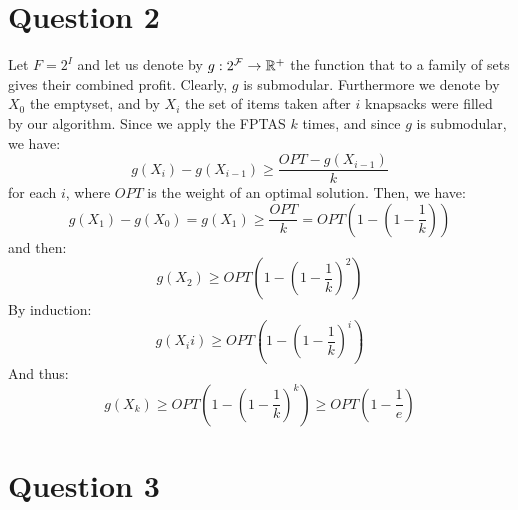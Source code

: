 \documentclass[math, info]{cours}
\begin{document}
\section{Question 2}
Let $F = 2^{I}$ and let us denote by $g: 2^{\mathcal{F}} \to \mathbb{R}^{+}$ the function that to a family of sets gives their combined profit.
Clearly, $g$ is submodular.
Furthermore we denote by $X_{0}$ the emptyset, and by $X_{i}$ the set of items taken after $i$ knapsacks were filled by our algorithm.
Since we apply the FPTAS $k$ times, and since $g$ is submodular, we have:
\begin{equation}
	g(X_{i}) - g(X_{i - 1}) \geq \frac{OPT - g(X_{i - 1})}{k}
	\label{eq:induction}
\end{equation}
for each $i$, where $OPT$ is the weight of an optimal solution.
Then, we have:
\begin{equation}
	g(X_{1}) - g(X_{0}) = g(X_{1}) \geq \frac{OPT}{k} = OPT(1 - \left(1 - \frac{1}{k}\right))
	\label{eq:firststep}
\end{equation}
and then:
\begin{equation*}
        g(X_{2}) \geq OPT(1 - \left(1 - \frac{1}{k}\right)^{2})
\end{equation*}
By induction:
\begin{equation*}
        g(X_{i}i) \geq OPT(1 - \left(1 - \frac{1}{k}\right)^{i})
\end{equation*}
And thus:
\begin{equation*}
        g(X_{k}) \geq OPT(1 - \left(1 - \frac{1}{k}\right)^{k}) \geq OPT(1 - \frac{1}{e})
\end{equation*}

\section{Question 3}
\end{document}
